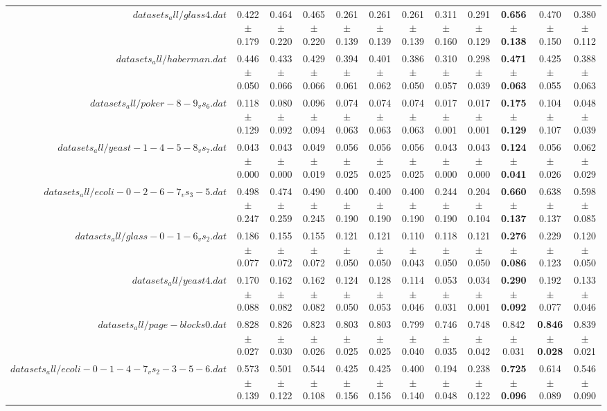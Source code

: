 \begin{table}[!ht]
{\begin{tabular}{r c c c c c c c c c c c}
$datasets_all/glass4.dat$ & 0.422 $\pm$ 0.179 & 0.464 $\pm$ 0.220 & 0.465 $\pm$ 0.220 & 0.261 $\pm$ 0.139 & 0.261 $\pm$ 0.139 & 0.261 $\pm$ 0.139 & 0.311 $\pm$ 0.160 & 0.291 $\pm$ 0.129 & \textbf{0.656 $\pm$ 0.138} & 0.470 $\pm$ 0.150 & 0.380 $\pm$ 0.112 \\
$datasets_all/haberman.dat$ & 0.446 $\pm$ 0.050 & 0.433 $\pm$ 0.066 & 0.429 $\pm$ 0.066 & 0.394 $\pm$ 0.061 & 0.401 $\pm$ 0.062 & 0.386 $\pm$ 0.050 & 0.310 $\pm$ 0.057 & 0.298 $\pm$ 0.039 & \textbf{0.471 $\pm$ 0.063} & 0.425 $\pm$ 0.055 & 0.388 $\pm$ 0.063 \\
$datasets_all/poker-8-9_vs_6.dat$ & 0.118 $\pm$ 0.129 & 0.080 $\pm$ 0.092 & 0.096 $\pm$ 0.094 & 0.074 $\pm$ 0.063 & 0.074 $\pm$ 0.063 & 0.074 $\pm$ 0.063 & 0.017 $\pm$ 0.001 & 0.017 $\pm$ 0.001 & \textbf{0.175 $\pm$ 0.129} & 0.104 $\pm$ 0.107 & 0.048 $\pm$ 0.039 \\
$datasets_all/yeast-1-4-5-8_vs_7.dat$ & 0.043 $\pm$ 0.000 & 0.043 $\pm$ 0.000 & 0.049 $\pm$ 0.019 & 0.056 $\pm$ 0.025 & 0.056 $\pm$ 0.025 & 0.056 $\pm$ 0.025 & 0.043 $\pm$ 0.000 & 0.043 $\pm$ 0.000 & \textbf{0.124 $\pm$ 0.041} & 0.056 $\pm$ 0.026 & 0.062 $\pm$ 0.029 \\
$datasets_all/ecoli-0-2-6-7_vs_3-5.dat$ & 0.498 $\pm$ 0.247 & 0.474 $\pm$ 0.259 & 0.490 $\pm$ 0.245 & 0.400 $\pm$ 0.190 & 0.400 $\pm$ 0.190 & 0.400 $\pm$ 0.190 & 0.244 $\pm$ 0.190 & 0.204 $\pm$ 0.104 & \textbf{0.660 $\pm$ 0.137} & 0.638 $\pm$ 0.137 & 0.598 $\pm$ 0.085 \\
$datasets_all/glass-0-1-6_vs_2.dat$ & 0.186 $\pm$ 0.077 & 0.155 $\pm$ 0.072 & 0.155 $\pm$ 0.072 & 0.121 $\pm$ 0.050 & 0.121 $\pm$ 0.050 & 0.110 $\pm$ 0.043 & 0.118 $\pm$ 0.050 & 0.121 $\pm$ 0.050 & \textbf{0.276 $\pm$ 0.086} & 0.229 $\pm$ 0.123 & 0.120 $\pm$ 0.050 \\
$datasets_all/yeast4.dat$ & 0.170 $\pm$ 0.088 & 0.162 $\pm$ 0.082 & 0.162 $\pm$ 0.082 & 0.124 $\pm$ 0.050 & 0.128 $\pm$ 0.053 & 0.114 $\pm$ 0.046 & 0.053 $\pm$ 0.031 & 0.034 $\pm$ 0.001 & \textbf{0.290 $\pm$ 0.092} & 0.192 $\pm$ 0.077 & 0.133 $\pm$ 0.046 \\
$datasets_all/page-blocks0.dat$ & 0.828 $\pm$ 0.027 & 0.826 $\pm$ 0.030 & 0.823 $\pm$ 0.026 & 0.803 $\pm$ 0.025 & 0.803 $\pm$ 0.025 & 0.799 $\pm$ 0.040 & 0.746 $\pm$ 0.035 & 0.748 $\pm$ 0.042 & 0.842 $\pm$ 0.031 & \textbf{0.846 $\pm$ 0.028} & 0.839 $\pm$ 0.021 \\
$datasets_all/ecoli-0-1-4-7_vs_2-3-5-6.dat$ & 0.573 $\pm$ 0.139 & 0.501 $\pm$ 0.122 & 0.544 $\pm$ 0.108 & 0.425 $\pm$ 0.156 & 0.425 $\pm$ 0.156 & 0.400 $\pm$ 0.140 & 0.194 $\pm$ 0.048 & 0.238 $\pm$ 0.122 & \textbf{0.725 $\pm$ 0.096} & 0.614 $\pm$ 0.089 & 0.546 $\pm$ 0.090 \\

\end{tabular}}
\end{table}
